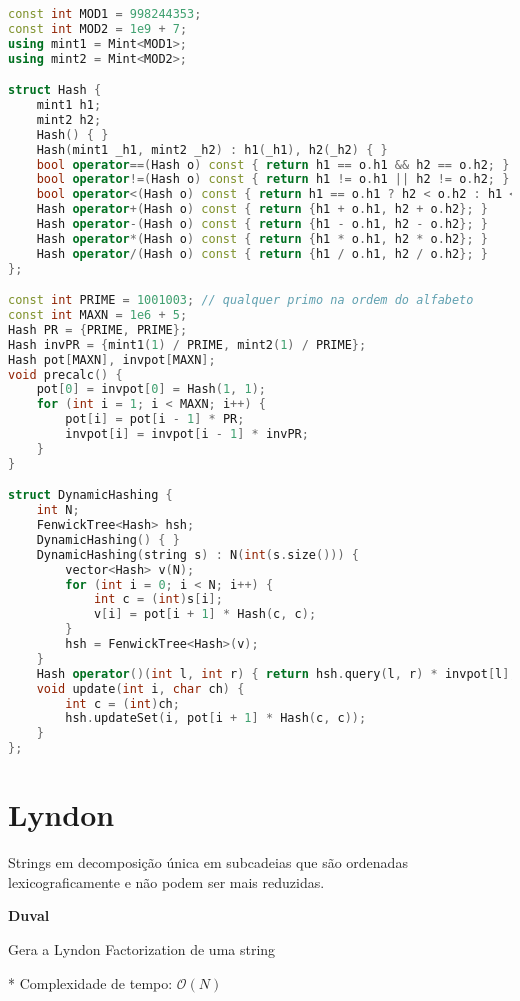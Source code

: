 \documentclass[10pt, a4paper, oneside]{book}
\begin{document}
\begin{lstlisting}[language=C++]
const int MOD1 = 998244353;
const int MOD2 = 1e9 + 7;
using mint1 = Mint<MOD1>;
using mint2 = Mint<MOD2>;

struct Hash {
    mint1 h1;
    mint2 h2;
    Hash() { }
    Hash(mint1 _h1, mint2 _h2) : h1(_h1), h2(_h2) { }
    bool operator==(Hash o) const { return h1 == o.h1 && h2 == o.h2; }
    bool operator!=(Hash o) const { return h1 != o.h1 || h2 != o.h2; }
    bool operator<(Hash o) const { return h1 == o.h1 ? h2 < o.h2 : h1 < o.h1; }
    Hash operator+(Hash o) const { return {h1 + o.h1, h2 + o.h2}; }
    Hash operator-(Hash o) const { return {h1 - o.h1, h2 - o.h2}; }
    Hash operator*(Hash o) const { return {h1 * o.h1, h2 * o.h2}; }
    Hash operator/(Hash o) const { return {h1 / o.h1, h2 / o.h2}; }
};

const int PRIME = 1001003; // qualquer primo na ordem do alfabeto
const int MAXN = 1e6 + 5;
Hash PR = {PRIME, PRIME};
Hash invPR = {mint1(1) / PRIME, mint2(1) / PRIME};
Hash pot[MAXN], invpot[MAXN];
void precalc() {
    pot[0] = invpot[0] = Hash(1, 1);
    for (int i = 1; i < MAXN; i++) {
        pot[i] = pot[i - 1] * PR;
        invpot[i] = invpot[i - 1] * invPR;
    }
}

struct DynamicHashing {
    int N;
    FenwickTree<Hash> hsh;
    DynamicHashing() { }
    DynamicHashing(string s) : N(int(s.size())) {
        vector<Hash> v(N);
        for (int i = 0; i < N; i++) {
            int c = (int)s[i];
            v[i] = pot[i + 1] * Hash(c, c);
        }
        hsh = FenwickTree<Hash>(v);
    }
    Hash operator()(int l, int r) { return hsh.query(l, r) * invpot[l]; }
    void update(int i, char ch) {
        int c = (int)ch;
        hsh.updateSet(i, pot[i + 1] * Hash(c, c));
    }
};
\end{lstlisting}
\hfill

\section{Lyndon}


Strings em decomposição única em subcadeias que são ordenadas lexicograficamente e não podem ser mais reduzidas.



\textbf{Duval} 



Gera a Lyndon Factorization de uma string



* Complexidade de tempo: $\mathcal{O}(N)$
\end{document}
